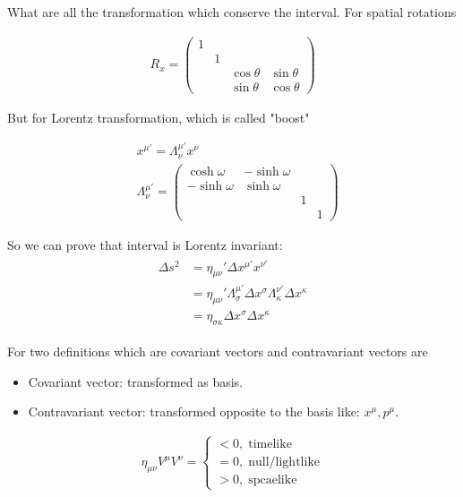 What are all the transformation which conserve the interval. For spatial rotations

\begin{align}
    R_{x}=\begin{pmatrix}
    1 &  &  & \\
     &  1&  & \\
     &  & \cos\theta &\sin \theta \\
     &  & \sin\theta &\cos\theta 
    \end{pmatrix}
\end{align}

But for Lorentz transformation, which is called "boost"

\begin{align}
    &x^{\mu'}=\Lambda^{\mu'}_{\nu}x^{\nu}\\
    &\Lambda^{\mu'}_\nu=\begin{pmatrix}
    \cosh \omega & -\sinh \omega &  & \\
    -\sinh \omega &\sinh \omega  &  & \\
     &  & 1 & \\
     &  &  & 1
    \end{pmatrix}
\end{align}

So we can prove that interval is Lorentz invariant:
\begin{align}
    \begin{aligned}
        \Delta s^{2}&=\eta_{\mu\nu}'\Delta x^{\mu'}x^{\nu'}\\
        &=\eta_{\mu\nu}'\Lambda^{\mu'}_\sigma \Delta x^{\sigma}\Lambda^{\nu'}_{\kappa} \Delta x^{\kappa}\\
        &=\eta_{\sigma \kappa}\Delta x^{\sigma}\Delta x^{\kappa}
    \end{aligned}
\end{align}

For two definitions which are covariant vectors and contravariant vectors are
\begin{itemize}
    \item Covariant vector: transformed as basis.
    \item Contravariant vector: transformed opposite to the basis like: $x^{\mu}, p^{\mu}$.
\end{itemize} 



\begin{align}
    \eta_{\mu\nu} V^{\mu}V^{\nu}=\begin{cases}
        <0,\; \text{timelike}\\
        =0,\; \text{null/lightlike}\\
        >0,\; \text{spcaelike}
    \end{cases}
\end{align}


